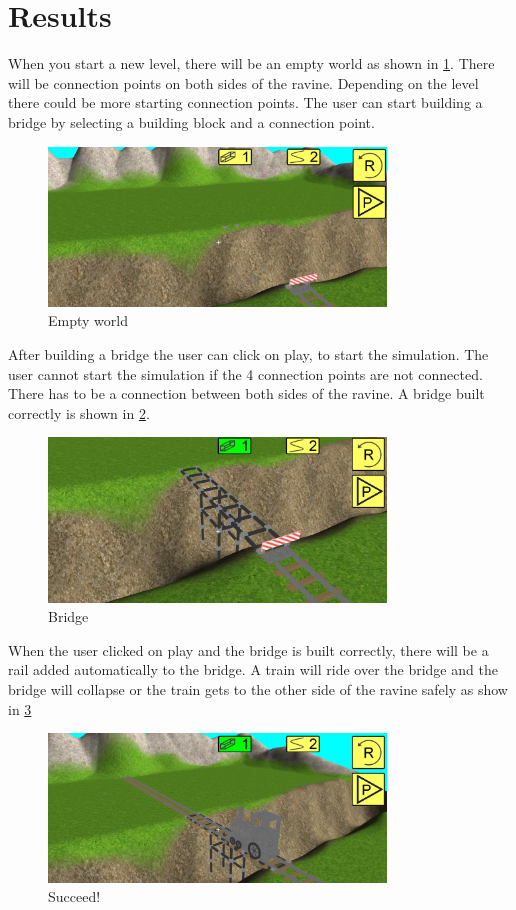 \section{Results}
When you start a new level, there will be an empty world as shown in \ref{fig:startup}. There will be connection points on both sides of the ravine. Depending on the level there could be more starting connection points. The user can start building a bridge by selecting a building block and a connection point. 
\begin{figure}[H]
    \centering
    \includegraphics[width=0.8\textwidth]{screenshots/initial.png}
    \caption{Empty world}
    \label{fig:startup}
\end{figure}
After building a bridge the user can click on play, to start the simulation. The user cannot start the simulation if the 4 connection points are not connected. There has to be a connection between both sides of the ravine. A bridge built correctly is shown in \ref{fig:fullbridge}.
\begin{figure}[H]
    \centering
    \includegraphics[width=0.8\textwidth]{screenshots/fullbridge.png}
    \caption{Bridge}
    \label{fig:fullbridge}
\end{figure}
When the user clicked on play and the bridge is built correctly, there will be a rail added automatically to the bridge. A train will ride over the bridge and the bridge will collapse or the train gets to the other side of the ravine safely as show in \ref{fig:full}
\begin{figure}[H]
    \centering
    \includegraphics[width=0.8\textwidth]{screenshots/Drives.png}
    \caption{Succeed!}
    \label{fig:full}
\end{figure}